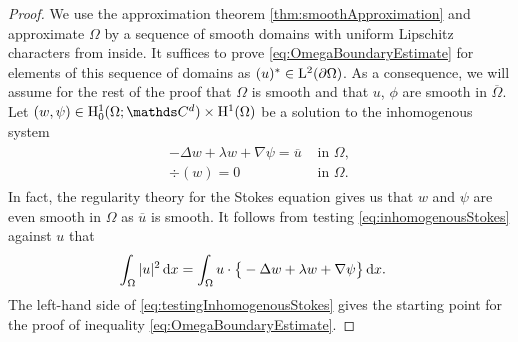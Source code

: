 \begin{proof}
  We use the approximation theorem \ref{thm:smoothApproximation} and approximate $\Omega$ by a sequence of smooth domains with uniform Lipschitz characters from inside.
  It suffices to prove \eqref{eq:OmegaBoundaryEstimate} for elements of this sequence of domains as $(u)^* \in \mathrm{L}^2(\partial\Omega)$.
  As a consequence, we will assume for the rest of the proof that $\Omega$ is smooth and that $u$, $\phi$ are smooth in $\overline\Omega$.
  Let $(w,\psi) \in \HH_0^1(\Omega; \C^d) \times \HH^1(\Omega)$ be a solution to the inhomogenous system
  \begin{align}
    \label{eq:inhomogenousStokes}
    \begin{alignedat}{1}
      - \Delta w + \lambda w + \nabla \psi = \overline u &\text{ in } \Omega, \\
      \div(w) = 0 &\text{ in } \Omega.
    \end{alignedat}
  \end{align}
  In fact, the regularity theory for the Stokes equation gives us that $w$ and $\psi$ are even smooth in $\Omega$ as $\overline u$ is smooth.
  It follows from testing \eqref{eq:inhomogenousStokes} against $u$ that
  \begin{align}
    \label{eq:testingInhomogenousStokes}
    \int_\Omega |u|^2 \, {\operatorname{d}\!{x}}
    &= \int_\Omega u \cdot \big\{ - \Delta w + \lambda w + \nabla \psi \big\} \, {\operatorname{d}\!{x}}.
  \end{align}
  The left-hand side of \eqref{eq:testingInhomogenousStokes} gives the starting point for the proof of inequality \eqref{eq:OmegaBoundaryEstimate}.
  

\end{proof}
